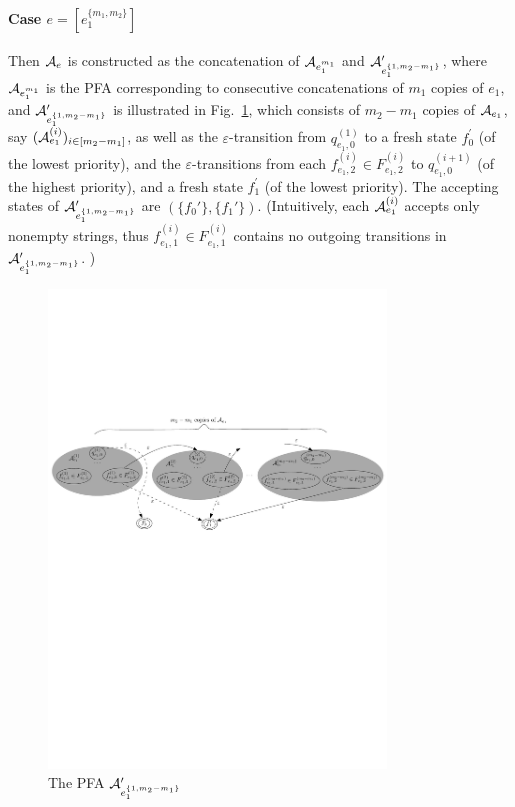 \paragraph{Case $e = [e_1^{\{m_1,m_2\}}]$} Then $\mathcal{A}_e$ is constructed as the concatenation of $\mathcal{A}_{e_1^{m_1}}$ and $\mathcal{A}^\prime_{e_1^{\{1,m_2-m_1\}}}$, where $\mathcal{A}_{e_1^{m_1}}$ is the PFA corresponding to consecutive concatenations of $m_1$ copies of $e_1$, and $\mathcal{A}^\prime_{e_1^{\{1,m_2-m_1\}}}$ is illustrated in Fig.~\ref{fig-reg2pfa-4}, which consists of $m_2-m_1$ copies of $\mathcal{A}_{e_1}$, say $(\mathcal{A}^{(i)}_{e_1})_{i \in [m_2-m_1]}$, as well as the $\varepsilon$-transition from $q^{(1)}_{e_1,0}$ to a fresh state $f^\prime_0$ (of the lowest priority), and the $\varepsilon$-transitions from each $f^{(i)}_{e_1,2} \in F^{(i)}_{e_1,2}$ to $q^{(i+1)}_{e_1,0}$ (of the highest priority), and a fresh state $f^\prime_1$ (of the lowest priority). The accepting states of $\mathcal{A}^\prime_{e_1^{\{1,m_2-m_1\}}}$ are $(\{f_0'\},\{f_1'\})$. (Intuitively, each $\mathcal{A}^{(i)}_{e_1}$ accepts only nonempty strings, thus $f^{(i)}_{e_1,1} \in F^{(i)}_{e_1,1}$ contains no outgoing transitions in $\mathcal{A}^\prime_{e_1^{\{1,m_2-m_1\}}}$. )
		\begin{figure}[ht]
			\centering
			\includegraphics[width = 0.8\textwidth]{reg2pfa-4.pdf}
			\caption{The PFA $\mathcal{A}^\prime_{e_1^{\{1,m_2-m_1\}}}$}
			\label{fig-reg2pfa-4}
		\end{figure}  


